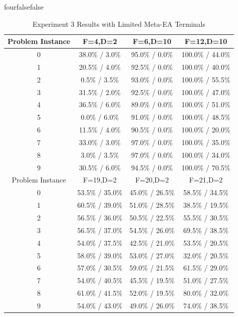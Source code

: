 \documentclass[times,12pt,titlepage]{mstogs}
\begin{document}
\begin{ThesisAppendix}{four}{false}{false}
\begin{table}
	\centering
	\caption{Experiment 3 Results with Limited Meta-EA Terminals}
	\label{tab:experiment3AddendumResults}
	\begin{tabular}{cccc}
		\toprule
		Problem Instance & F=4,D=2 & F=6,D=10 & F=12,D=10\\
		\hline
		0 & 38.0\% / 3.0\% & 95.0\% / 0.0\% & 100.0\% / 44.0\%\\
		\hline
		1 & 20.5\% / 4.0\% & 92.5\% / 0.0\% & 100.0\% / 40.0\%\\
		\hline
		2 & 0.5\% / 3.5\% & 93.0\% / 0.0\% & 100.0\% / 55.5\%\\
		\hline
		3 & 31.5\% / 2.0\% & 92.5\% / 0.0\% & 100.0\% / 47.0\%\\
		\hline
		4 & 36.5\% / 6.0\% & 89.0\% / 0.0\% & 100.0\% / 51.0\%\\
		\hline
		5 & 0.0\% / 6.0\% & 91.0\% / 0.0\% & 100.0\% / 48.5\%\\
		\hline
		6 & 11.5\% / 4.0\% & 90.5\% / 0.0\% & 100.0\% / 20.0\%\\
		\hline
		7 & 33.0\% / 3.0\% & 97.0\% / 0.0\% & 100.0\% / 35.0\%\\
		\hline
		8 & 3.0\% / 3.5\% & 97.0\% / 0.0\% & 100.0\% / 34.0\%\\
		\hline
		9 & 30.5\% / 6.0\% & 94.5\% / 0.0\% & 100.0\% / 70.5\%\\
		\hline
		\hline
		Problem Instance & F=19,D=2 & F=20,D=2 & F=21,D=2\\
		\hline
		0 & 53.5\% / 35.0\% & 45.0\% / 26.5\% & 58.5\% / 34.5\%\\
		\hline
		1 & 60.5\% / 39.0\% & 51.0\% / 28.5\% & 38.5\% / 19.5\%\\
		\hline
		2 & 56.5\% / 36.0\% & 50.5\% / 22.5\% & 55.5\% / 30.5\%\\
		\hline
		3 & 56.5\% / 37.0\% & 54.5\% / 26.0\% & 69.5\% / 38.5\%\\
		\hline
		4 & 54.0\% / 37.5\% & 42.5\% / 21.0\% & 53.5\% / 20.5\%\\
		\hline
		5 & 58.0\% / 39.0\% & 53.0\% / 27.0\% & 32.0\% / 20.5\%\\
		\hline
		6 & 57.0\% / 30.5\% & 59.0\% / 21.5\% & 61.5\% / 29.0\%\\
		\hline
		7 & 54.0\% / 40.5\% & 45.5\% / 19.5\% & 51.0\% / 27.5\%\\
		\hline
		8 & 61.0\% / 41.5\% & 52.0\% / 19.5\% & 80.0\% / 32.0\%\\
		\hline
		9 & 54.0\% / 43.0\% & 49.0\% / 26.0\% & 74.0\% / 38.5\%\\
		
		\bottomrule
	\end{tabular}
\end{table}

\end{ThesisAppendix}
\end{document}
